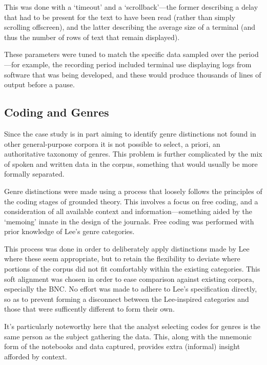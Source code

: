 This was done with a `timeout' and a `scrollback'---the former describing a delay that had to be present for the text to have been read (rather than simply scrolling offscreen), and the latter describing the average size of a terminal (and thus the number of rows of text that remain displayed).

These parameters were tuned to match the specific data sampled over the period---for example, the recording period included terminal use displaying logs from software that was being developed, and these would produce thousands of lines of output before a pause.




\subsection{Coding and Genres}
Since the case study is in part aiming to identify genre distinctions not found in other general-purpose corpora it is not possible to select, a priori, an authoritative taxonomy of genres.  This problem is further complicated by the mix of spoken and written data in the corpus, something that would usually be more formally separated.


Genre distinctions were made using a process that loosely follows the principles of the coding stages of grounded theory\cite{glaser1992emergence}.  
This involves a focus on free coding, and a consideration of all available context and information---something aided by the `memoing' innate in the design of the journals.  Free coding was performed with prior knowledge of Lee's genre categories.


This process was done in order to deliberately apply distinctions made by Lee where these seem appropriate, but to retain the flexibility to deviate where portions of the corpus did not fit comfortably within the existing categories.  This soft alignment was chosen in order to ease comparison against existing corpora, especially the BNC\@.  No effort was made to adhere to Lee's specification directly, so as to prevent forming a disconnect between the Lee-inspired categories and those that were sufficently different to form their own.

It's particularly noteworthy here that the analyst selecting codes for genres is the same person as the subject gathering the data.  This, along with the mnemonic form of the notebooks and data captured, provides extra (informal) insight afforded by context.


